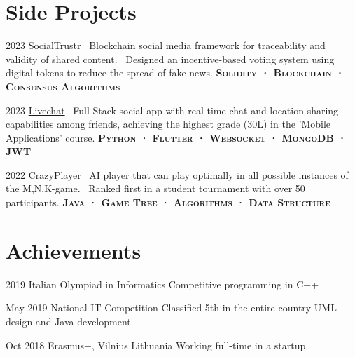 \documentclass{tccv}
\begin{document}
\section{Side Projects}

\begin{yearlist}

\item{2023}
     {\href{https://github.com/manuelarto/socialtrustr}{SocialTrustr}}
     {\textbullet~Blockchain social media framework for traceability and validity of shared content. \newline
     \textbullet~Designed an incentive-based voting system using digital tokens to reduce the spread of fake news. \newline
     \textbf{\textsc{Solidity · Blockchain · Consensus Algorithms}}}
\item{2023}
     {\href{https://github.com/manuelarto/livechat}{Livechat}}
     {\textbullet~Full Stack social app with real-time chat and location sharing capabilities among friends, achieving the highest grade (30L) in the 'Mobile Applications' course. \newline
    \textbf{\textsc{Python · Flutter · Websocket · MongoDB · JWT}}}
\item{2022}
     {\href{https://github.com/manuelarto/crazyplayer}{CrazyPlayer}}
     {\textbullet~AI player that can play optimally in all possible instances of the M,N,K-game. \newline
     \textbullet~Ranked first in a student tournament with over 50 participants. \newline
    \textbf{\textsc{Java · Game Tree · Algorithms · Data Structure}}}

\end{yearlist}


\section{Achievements}

\begin{yearlist}

\item[]{2019}
     {Italian Olympiad in Informatics}
     {Competitive programming in C++}

\item[]{May 2019}
     {National IT Competition}
     {Classified 5th in the entire country \newline
     UML design and Java development}

\item[]{Oct 2018}
     {Erasmus+, Vilnius Lithuania}
     {Working full-time in a startup}

\end{yearlist}
\end{document}
